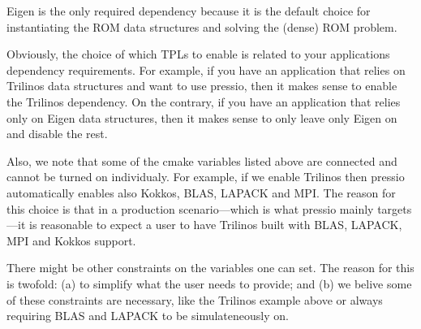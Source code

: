 \begin{DoxyParagraph}{}
Eigen is the only required dependency because it is the default choice for instantiating the R\+OM data structures and solving the (dense) R\+OM problem.
\end{DoxyParagraph}
Obviously, the choice of which T\+P\+Ls to enable is related to your application\textquotesingle{}s dependency requirements. For example, if you have an application that relies on Trilinos data structures and want to use {\ttfamily pressio}, then it makes sense to enable the Trilinos dependency. On the contrary, if you have an application that relies only on Eigen data structures, then it makes sense to only leave only Eigen on and disable the rest.

Also, we note that some of the cmake variables listed above are connected and cannot be turned on individualy. For example, if we enable Trilinos then {\ttfamily pressio} automatically enables also Kokkos, B\+L\+AS, L\+A\+P\+A\+CK and M\+PI. The reason for this choice is that in a production scenario---which is what pressio mainly targets---it is reasonable to expect a user to have Trilinos built with B\+L\+AS, L\+A\+P\+A\+CK, M\+PI and Kokkos support.

There might be other constraints on the variables one can set. The reason for this is twofold\+: (a) to simplify what the user needs to provide; and (b) we belive some of these constraints are necessary, like the Trilinos example above or always requiring B\+L\+AS and L\+A\+P\+A\+CK to be simulateneously on.

